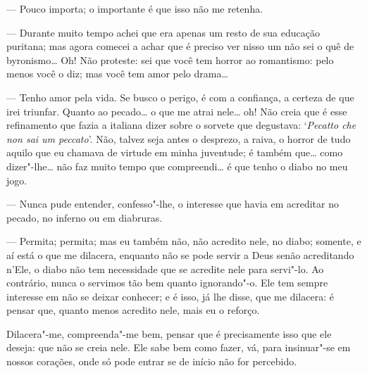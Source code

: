 --- Pouco importa; o importante é que isso não me retenha.

--- Durante muito tempo achei que era apenas um resto de sua educação
puritana; mas agora comecei a achar que é preciso ver nisso um não sei o
quê de byronismo\ldots{} Oh! Não proteste: sei que você tem horror ao
romantismo: pelo menos você o diz; mas você tem amor pelo drama\ldots{}

--- Tenho amor pela vida. Se busco o perigo, é com a confiança, a certeza
de que irei triunfar. Quanto ao pecado\ldots{} o que me atrai nele\ldots{} oh!
Não creia que é esse refinamento que fazia a italiana dizer sobre o
sorvete que degustava: `\emph{Pecatto che non sai um peccato}'. Não,
talvez seja antes o desprezo, a raiva, o horror de tudo aquilo que eu
chamava de virtude em minha juventude; é também que\ldots{} como dizer"-lhe\ldots{} não faz muito tempo que compreendi\ldots{} é que tenho o diabo no meu
jogo.

--- Nunca pude entender, confesso"-lhe, o interesse que havia em acreditar
no pecado, no inferno ou em diabruras.

--- Permita; permita; mas eu também não, não acredito nele, no diabo;
somente, e aí está o que me dilacera, enquanto não se pode servir a Deus
senão acreditando n'Ele, o diabo não tem necessidade que se acredite
nele para servi"-lo. Ao contrário, nunca o servimos tão bem quanto
ignorando"-o. Ele tem sempre interesse em não se deixar conhecer; e é
isso, já lhe disse, que me dilacera: é pensar que, quanto menos acredito
nele, mais eu o reforço.

Dilacera"-me, compreenda"-me bem, pensar que é precisamente isso que ele
deseja: que não se creia nele. Ele sabe bem como fazer, vá, para
insinuar"-se em nossos corações, onde só pode entrar se de início não for
percebido.

